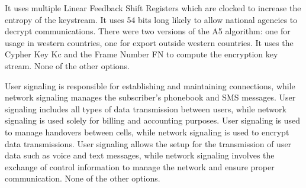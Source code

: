 \begin{checkboxes}
    \CorrectChoice It uses multiple Linear Feedback Shift Registers which are clocked to increase the entropy of the keystream.
    \CorrectChoice It uses 54 bits long likely to allow national agencies to decrypt communications.
    \CorrectChoice There were two versions of the A5 algorithm: one for usage in western countries, one for export outside western countries.
    \CorrectChoice It uses the Cypher Key Kc and the Frame Number FN to compute the encryption key stream.
    \choice None of the other options.
\end{checkboxes}

\begin{checkboxes}
    \choice User signaling is responsible for establishing and maintaining connections, while network signaling manages the subscriber's phonebook and SMS messages.
    \choice User signaling includes all types of data transmission between users, while network signaling is used solely for billing and accounting purposes.
    \choice User signaling is used to manage handovers between cells, while network signaling is used to encrypt data transmissions.
    \CorrectChoice User signaling allows the setup for the transmission of user data such as voice and text messages, while network signaling involves the exchange of control information to manage the network and ensure proper communication.
    \choice None of the other options.
\end{checkboxes}